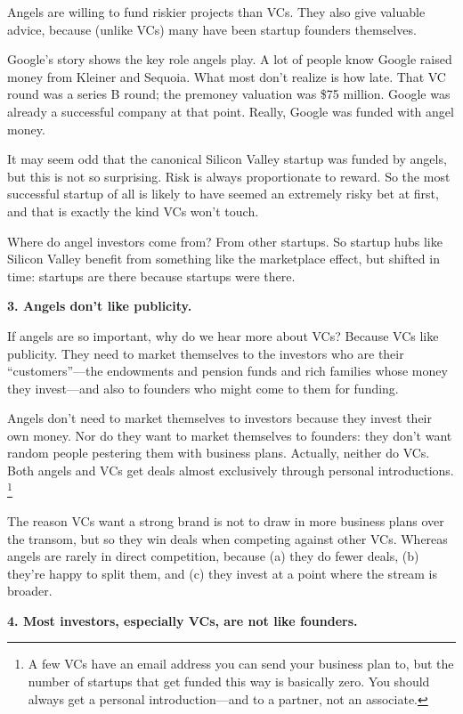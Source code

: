 Angels are willing to fund riskier projects than VCs. They also give
valuable advice, because (unlike VCs) many have been startup founders
themselves.

Google's story shows the key role angels play. A lot of people know
Google raised money from Kleiner and Sequoia. What most don't realize is
how late. That VC round was a series B round; the premoney valuation was
\$75 million. Google was already a successful company at that point.
Really, Google was funded with angel money.

It may seem odd that the canonical Silicon Valley startup was funded by
angels, but this is not so surprising. Risk is always proportionate to
reward. So the most successful startup of all is likely to have seemed
an extremely risky bet at first, and that is exactly the kind VCs won't
touch.

Where do angel investors come from? From other startups. So startup hubs
like Silicon Valley benefit from something like the marketplace effect,
but shifted in time: startups are there because startups were there.

\textbf{3. Angels don't like publicity.}

If angels are so important, why do we hear more about VCs? Because VCs
like publicity. They need to market themselves to the investors who are
their ``customers''---the endowments and pension funds and rich families
whose money they invest---and also to founders who might come to them
for funding.

Angels don't need to market themselves to investors because they invest
their own money. Nor do they want to market themselves to founders: they
don't want random people pestering them with business plans. Actually,
neither do VCs. Both angels and VCs get deals almost exclusively through
personal introductions. \footnote{A few VCs have an email address you can send your business plan
to, but the number of startups that get funded this way is basically
zero. You should always get a personal introduction---and to a partner,
not an associate.}

The reason VCs want a strong brand is not to draw in more business plans
over the transom, but so they win deals when competing against other
VCs. Whereas angels are rarely in direct competition, because (a) they
do fewer deals, (b) they're happy to split them, and (c) they invest at
a point where the stream is broader.

\textbf{4. Most investors, especially VCs, are not like founders.}

